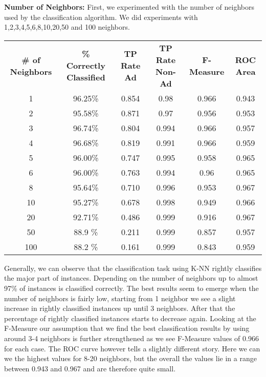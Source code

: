 \documentclass{article}
\begin{document}
\textbf{Number of Neighbors:}
First, we experimented with the number of neighbors used by the classification algorithm. We did experiments with 1,2,3,4,5,6,8,10,20,50 and 100 neighbors.


\begin{tabular}{ c | c | c | c | c | c}
\textbf{\# of Neighbors} & \textbf{\% Correctly Classified} & \textbf{TP Rate Ad} & \textbf{TP Rate Non-Ad} & \textbf{F-Measure} & \textbf{ROC Area}\\
1   & 96.25\% & 0.854 & 0.98  & 0.966 & 0.943\\
2   & 95.58\% & 0.871 & 0.97  & 0.956 & 0.953\\
3   & 96.74\% & 0.804 & 0.994 & 0.966 & 0.957\\
4   & 96.68\% & 0.819 & 0.991 & 0.966 & 0.959\\
5   & 96.00\% & 0.747 & 0.995 & 0.958 & 0.965\\
6   & 96.00\% & 0.763 & 0.994 & 0.96  & 0.965\\
8   & 95.64\% & 0.710 & 0.996 & 0.953 & 0.967\\
10  & 95.27\% & 0.678 & 0.998 & 0.949 & 0.966\\
20  & 92.71\% & 0.486 & 0.999 & 0.916 & 0.967\\
50  & 88.9 \% & 0.211 & 0.999 & 0.857 & 0.957\\
100 & 88.2 \% & 0.161 & 0.999 & 0.843 & 0.959\\
\end{tabular}


Generally, we can observe that the classification task using K-NN rightly classifies the major part of instances. Depending on the number of neighbors up to almost 97\% of instances is classified correctly. The best results seem to emerge when the number of neighbors is fairly low, starting from 1 neighbor we see a slight increase in rightly classified instances up until 3 neighbors. After that the percentage of rightly classified instances starts to decrease again. Looking at the F-Measure our assumption that we find the best classification results by using around 3-4 neighbors is further strengthened as we see F-Measure values of 0.966 for each case. The ROC curve however tells a slightly different story. Here we can we the highest values for 8-20 neighbors, but the overall the values lie in a range between 0.943 and 0.967 and are therefore quite small.
\end{document}
